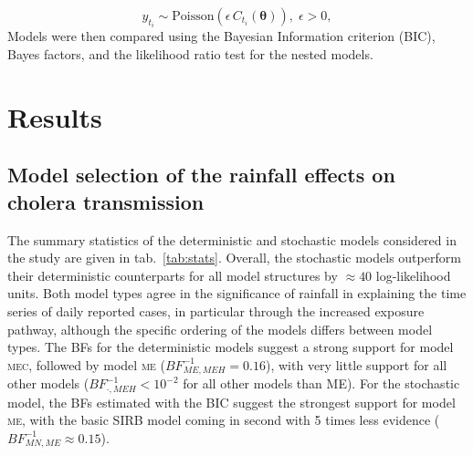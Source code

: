 \begin{equation}
 y_{t_i}  \sim \text{Poisson}\left(\epsilon \,C_{t_i}(\boldsymbol{\theta})\right), \; \epsilon > 0,
 \label{eq:obs}
\end{equation}
 Models were then compared using the Bayesian Information criterion (BIC), Bayes factors, and the likelihood ratio test for the nested models.
 
 
\section{Results}

\subsection{Model selection of the rainfall effects on cholera transmission}
The summary statistics of the deterministic and stochastic models considered in the study are given in tab.~\ref{tab:stats}. Overall, the stochastic models outperform their deterministic counterparts for all model structures by $\approx 40$ log-likelihood units. Both model types agree in the significance of rainfall in explaining the time series of daily reported cases, in particular through the increased exposure pathway, although the specific ordering of the models differs between model types. The BFs for the deterministic models suggest a strong support for model \textsc{mec}, followed by model \textsc{me} ($BF^{-1}_{ME,MEH} = 0.16$), with very little support for all other models ($BF^{-1}_{\boldsymbol{\cdot},MEH}< 10^{-2}$ for all other models than ME). For the stochastic model, the BFs estimated with the BIC suggest the strongest support for model \textsc{me}, with the basic SIRB model coming in second with 5 times less evidence ($BF^{-1}_{MN,ME} \approx 0.15$). 
